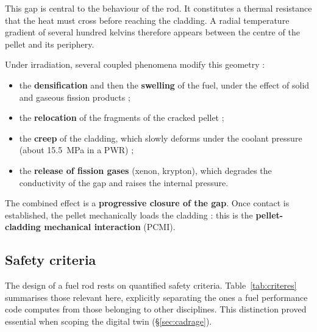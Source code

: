 \documentclass[12pt,a4paper]{report}
\begin{document}
This gap is central to the behaviour of the rod. It constitutes a thermal
resistance that the heat must cross before reaching the cladding. A radial
temperature gradient of several hundred kelvins therefore appears between the
centre of the pellet and its periphery.

Under irradiation, several coupled phenomena modify this geometry :
\begin{itemize}
  \item the \textbf{densification} and then the \textbf{swelling} of the fuel,
    under the effect of solid and gaseous fission products ;
  \item the \textbf{relocation} of the fragments of the cracked pellet ;
  \item the \textbf{creep} of the cladding, which slowly deforms under the
    coolant pressure (about \SI{15.5}{\mega\pascal} in a PWR) ;
  \item the \textbf{release of fission gases} (xenon, krypton), which degrades
    the conductivity of the gap and raises the internal pressure.
\end{itemize}

The combined effect is a \textbf{progressive closure of the gap}. Once contact
is established, the pellet mechanically loads the cladding : this is the
\textbf{pellet-cladding mechanical interaction} (PCMI).

\subsection{Safety criteria}

The design of a fuel rod rests on quantified safety criteria.
Table~\ref{tab:criteres} summarises those relevant here, explicitly separating
the ones a fuel performance code computes from those belonging to other
disciplines. This distinction proved essential when scoping the digital twin
(§\ref{sec:cadrage}).
\end{document}
